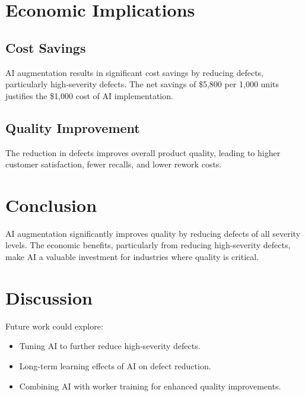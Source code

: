 \documentclass{article}
\begin{document}
\section{Economic Implications}
\subsection{Cost Savings}
AI augmentation results in significant cost savings by reducing defects, particularly high-severity defects. The net savings of \$5,800 per 1,000 units justifies the \$1,000 cost of AI implementation.

\subsection{Quality Improvement}
The reduction in defects improves overall product quality, leading to higher customer satisfaction, fewer recalls, and lower rework costs.

\section{Conclusion}
AI augmentation significantly improves quality by reducing defects of all severity levels. The economic benefits, particularly from reducing high-severity defects, make AI a valuable investment for industries where quality is critical.

\section{Discussion}
Future work could explore:
\begin{itemize}
    \item Tuning AI to further reduce high-severity defects.
    \item Long-term learning effects of AI on defect reduction.
    \item Combining AI with worker training for enhanced quality improvements.
\end{itemize}
\end{document}

